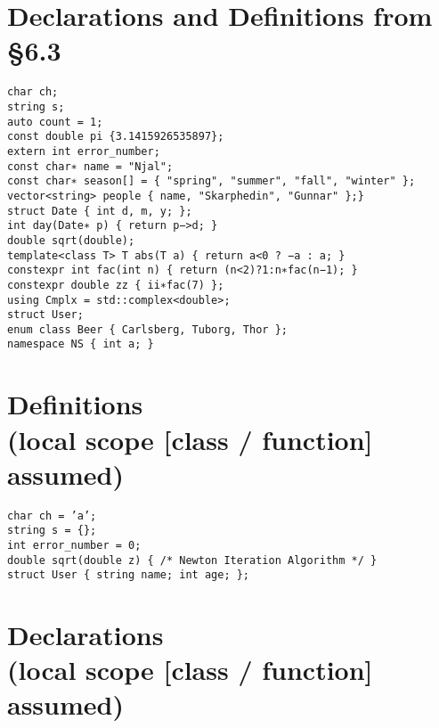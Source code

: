 \documentclass{article}
\begin{document}
 \section{Declarations and Definitions from \S6.3}
 \texttt{char ch;}
 \\
 \texttt{string s;}
 \\
 \texttt{auto count = 1;}
 \\
 \texttt{const double pi \{3.1415926535897\};}
 \\
 \texttt{extern int error\_number;}
 \\
 \texttt{const char∗ name = "Njal";}
 \\
 \texttt{const char∗ season[] = \{ "spring", "summer", "fall", "winter" \};}
 \\
 \texttt{vector<string> people \{ name, "Skarphedin", "Gunnar" \};\}}
 \\
 \texttt{struct Date \{ int d, m, y; \};}
 \\
 \texttt{int day(Date∗ p) \{ return p−>d; \}}
 \\
 \texttt{double sqrt(double);}
 \\
 \texttt{template<class T> T abs(T a) \{ return a<0 ? −a : a; \}}
 \\
 \texttt{constexpr int fac(int n) \{ return (n<2)?1:n∗fac(n−1); \}}
 \\
 \texttt{constexpr double zz \{ ii∗fac(7) \};}
 \\
 \texttt{using Cmplx = std::complex<double>;}
 \\
 \texttt{struct User;}
 \\
 \texttt{enum class Beer \{ Carlsberg, Tuborg, Thor \};}
 \\
 \texttt{namespace NS \{ int a; \}}
 
 \section{Definitions \\ (local scope [class / function] assumed)}
 \texttt{char ch = 'a'; }
 \\
 \texttt{string s = \{\};}
 \\
 \texttt{int error\_number = 0;}
 \\
 \texttt{double sqrt(double z) \{ /* Newton Iteration Algorithm */ \}}
 \\
 \texttt{struct User \{ string name; int age; \};}
 
 \section{Declarations \\ (local scope [class / function] assumed)}
 
\end{document}
